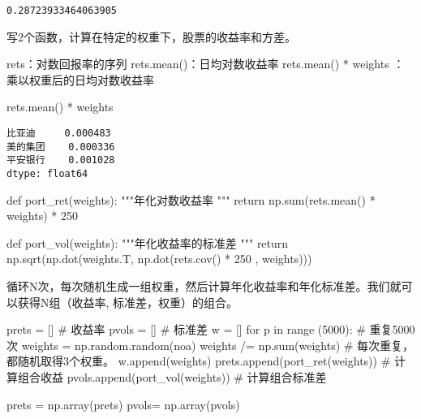 \documentclass[
  letterpaper,
  DIV=11,
  numbers=noendperiod]{scrreprt}
\newenvironment{Shaded}{\begin{snugshade}}{\end{snugshade}}
\newcommand{\BuiltInTok}[1]{\textcolor[rgb]{0.00,0.23,0.31}{#1}}
\newcommand{\CommentTok}[1]{\textcolor[rgb]{0.37,0.37,0.37}{#1}}
\newcommand{\ControlFlowTok}[1]{\textcolor[rgb]{0.00,0.23,0.31}{#1}}
\newcommand{\DecValTok}[1]{\textcolor[rgb]{0.68,0.00,0.00}{#1}}
\newcommand{\KeywordTok}[1]{\textcolor[rgb]{0.00,0.23,0.31}{#1}}
\newcommand{\NormalTok}[1]{\textcolor[rgb]{0.00,0.23,0.31}{#1}}
\newcommand{\OperatorTok}[1]{\textcolor[rgb]{0.37,0.37,0.37}{#1}}
\begin{document}
\begin{verbatim}
0.28723933464063905
\end{verbatim}

写2个函数，计算在特定的权重下，股票的收益率和方差。

rets：对数回报率的序列 rets.mean()：日均对数收益率 rets.mean() * weights
：乘以权重后的日均对数收益率

\begin{Shaded}
\begin{Highlighting}[]
\NormalTok{rets.mean() }\OperatorTok{*}\NormalTok{ weights}
\end{Highlighting}
\end{Shaded}

\begin{verbatim}
比亚迪     0.000483
美的集团    0.000336
平安银行    0.001028
dtype: float64
\end{verbatim}

\begin{Shaded}
\begin{Highlighting}[]
\KeywordTok{def}\NormalTok{ port\_ret(weights): }
    \CommentTok{"""年化对数收益率}
\CommentTok{    """}
    \ControlFlowTok{return}\NormalTok{ np.}\BuiltInTok{sum}\NormalTok{(rets.mean() }\OperatorTok{*}\NormalTok{ weights) }\OperatorTok{*} \DecValTok{250}

\KeywordTok{def}\NormalTok{ port\_vol(weights): }
    \CommentTok{"""年化收益率的标准差}
\CommentTok{    """}
    \ControlFlowTok{return}\NormalTok{ np.sqrt(np.dot(weights.T, np.dot(rets.cov() }\OperatorTok{*} \DecValTok{250}\NormalTok{ , weights))) }
\end{Highlighting}
\end{Shaded}

循环N次，每次随机生成一组权重，然后计算年化收益率和年化标准差。我们就可以获得N组（收益率,
标准差，权重）的组合。

\begin{Shaded}
\begin{Highlighting}[]
\NormalTok{prets }\OperatorTok{=}\NormalTok{ []  }\CommentTok{\# 收益率}
\NormalTok{pvols }\OperatorTok{=}\NormalTok{ []  }\CommentTok{\# 标准差}
\NormalTok{w }\OperatorTok{=}\NormalTok{ []}
\ControlFlowTok{for}\NormalTok{ p }\KeywordTok{in} \BuiltInTok{range}\NormalTok{ (}\DecValTok{5000}\NormalTok{):  }\CommentTok{\# 重复5000次}
\NormalTok{    weights }\OperatorTok{=}\NormalTok{ np.random.random(noa)  }
\NormalTok{    weights }\OperatorTok{/=}\NormalTok{ np.}\BuiltInTok{sum}\NormalTok{(weights)  }\CommentTok{\# 每次重复，都随机取得3个权重。}
\NormalTok{    w.append(weights)}
\NormalTok{    prets.append(port\_ret(weights))  }\CommentTok{\# 计算组合收益}
\NormalTok{    pvols.append(port\_vol(weights))  }\CommentTok{\# 计算组合标准差}
    
\NormalTok{prets }\OperatorTok{=}\NormalTok{ np.array(prets) }
\NormalTok{pvols}\OperatorTok{=}\NormalTok{ np.array(pvols) }
\end{Highlighting}
\end{Shaded}
\end{document}
